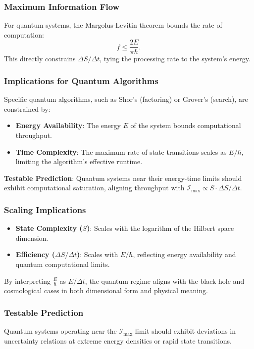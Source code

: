 \documentclass[12pt]{article}
\begin{document}
\subsubsection{Maximum Information Flow}
For quantum systems, the Margolus-Levitin theorem bounds the rate of computation:
\[
f \leq \frac{2E}{\pi \hbar}.
\]
This directly constrains \( \Delta S / \Delta t \), tying the processing rate to the system’s energy.

\subsubsection{Implications for Quantum Algorithms}
Specific quantum algorithms, such as Shor’s (factoring) or Grover’s (search), are constrained by:
\begin{itemize}
    \item \textbf{Energy Availability}: The energy \( E \) of the system bounds computational throughput.
    \item \textbf{Time Complexity}: The maximum rate of state transitions scales as \( E / \hbar \), limiting the algorithm’s effective runtime.
\end{itemize}

\textbf{Testable Prediction}: Quantum systems near their energy-time limits should exhibit computational saturation, aligning throughput with \( \mathcal{I}_{\text{max}} \propto S \cdot \Delta S / \Delta t \).

\subsubsection{Scaling Implications}
\begin{itemize}
    \item \textbf{State Complexity (\( S \))}: Scales with the logarithm of the Hilbert space dimension.
    \item \textbf{Efficiency (\( \Delta S / \Delta t \))}: Scales with \( E / \hbar \), reflecting energy availability and quantum computational limits.
\end{itemize}

By interpreting \( \frac{E}{\hbar} \) as \( E / \Delta t \), the quantum regime aligns with the black hole and cosmological cases in both dimensional form and physical meaning.

\subsubsection{Testable Prediction}
Quantum systems operating near the \( \mathcal{I}_{\text{max}} \) limit should exhibit deviations in uncertainty relations at extreme energy densities or rapid state transitions.
\end{document}
